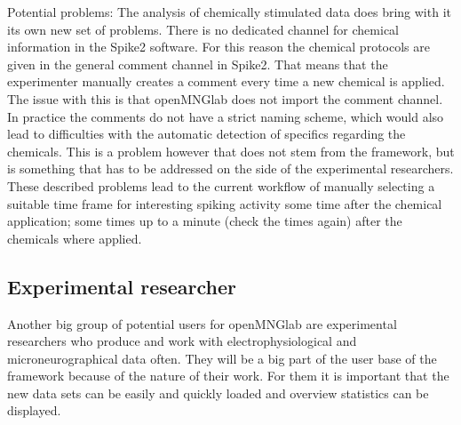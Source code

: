 Potential problems: The analysis of chemically stimulated data does bring with it its own new set of problems. There is no dedicated channel for chemical information in the Spike2 software. For this reason the chemical protocols are given in the general comment channel in Spike2. That means that the experimenter manually creates a comment every time a new chemical is applied. The issue with this is that openMNGlab does not import the comment channel. In practice the comments do not have a strict naming scheme, which would also lead to difficulties with the automatic detection of specifics regarding the chemicals. This is a problem however that does not stem from the framework, but is something that has to be addressed on the side of the experimental researchers.\\
These described problems lead to the current workflow of manually selecting a suitable time frame for interesting spiking activity some time after the chemical application; some times up to a minute (check the times again) after the chemicals where applied.

\subsection{Experimental researcher}
Another big group of potential users for openMNGlab are experimental researchers who produce and work with electrophysiological and microneurographical data often. They will be a big part of the user base of the framework because of the nature of their work. For them it is important that the new data sets can be easily and quickly loaded and overview statistics can be displayed.


 

